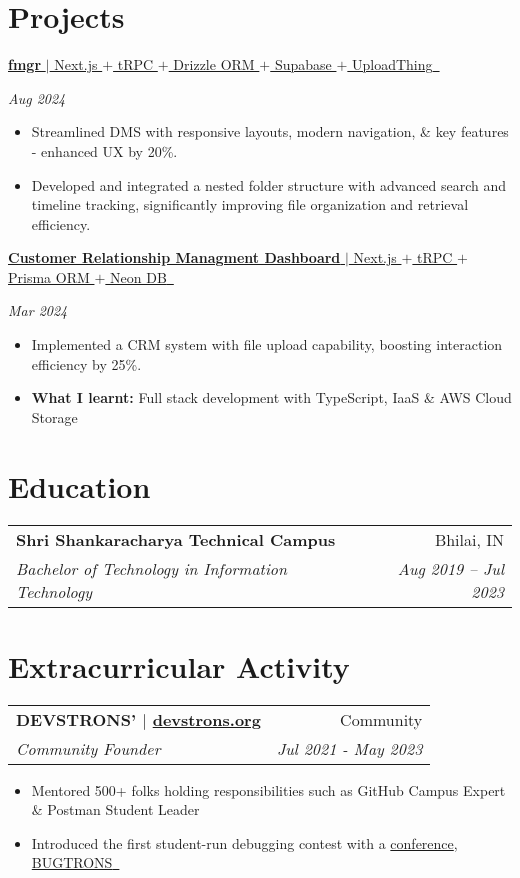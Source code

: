 \documentclass[letterpaper,11pt]{article}
\makeatletter
\newcommand{\resumeItem}[2]{
  \item\small{
    \textbf{#1}{#2 \vspace{-6pt}}
  }
}
\newcommand{\project}[2]{
\textbf{}{
\href{#2}{{#1} \,\faExternalLink}
}
    \hfill
}
\newcommand{\projectHeading}[3]{\project{#1}{#2}
{#3}\\ \vspace{-1pt}}
\newcommand{\resumeSubHeading}[4]{
    \vspace{-1pt}
    \begin{tabular*}{\textwidth}{l@{\extracolsep{\fill}}r}
      \textbf{#1} & #2 \\
      \textit{\small#3} & \textit{\small #4} \\
    \end{tabular*}\vspace{-5pt}
}
\newcommand{\resumeSubHeadingListStart}{\begin{itemize}[leftmargin=*]}
\newcommand{\resumeSubHeadingListEnd}{\end{itemize}}
\newcommand{\resumeItemListStart}{\begin{itemize}}
\newcommand{\resumeItemListEnd}{\end{itemize}\vspace{-5pt}}
\makeatother
\begin{document}
\section{Projects}
\vspace{2pt}
\projectHeading{\textbf{fmgr} $|$ Next.js $+$ tRPC $+$ Drizzle ORM $+$ Supabase $+$ UploadThing}{https://fmgr.vercel.app}{\textit{\small{Aug 2024}}}
\vspace{-5pt}
\resumeItemListStart
\resumeItem{}{Streamlined DMS with responsive layouts, modern navigation, \& key features - enhanced UX by 20\%.}
\vspace{0pt}
\resumeItem{}{Developed and integrated a nested folder structure with advanced search and timeline tracking, significantly improving file organization and retrieval efficiency.}
\resumeItemListEnd
\vspace{9pt}
\projectHeading{\textbf{Customer Relationship Managment Dashboard} $|$ Next.js $+$ tRPC $+$ Prisma ORM $+$ Neon DB}{https://github.com/aminoxix/crm}{\textit{\small{Mar 2024}}}
\vspace{-5pt}
\resumeItemListStart
\resumeItem{}{Implemented a CRM system with file upload capability, boosting interaction efficiency by 25\%.}
\vspace{0pt}
\resumeItem{What I learnt: }{Full stack development with TypeScript, IaaS \& AWS Cloud Storage}
\resumeItemListEnd
\vspace{-2pt}

\section{Education}
\resumeSubHeading
{Shri Shankaracharya Technical Campus}{Bhilai, IN}
{Bachelor of Technology in Information Technology}{Aug 2019 -- Jul 2023}
\vspace{-4pt}

\section{Extracurricular Activity}
\resumeSubHeading
{DEVSTRONS' $|$ \href{https://devstrons.org}{devstrons.org}}{Community}
{Community Founder}{Jul 2021 - May 2023}
\resumeItemListStart
\resumeItem{}{Mentored 500+ folks holding responsibilities such as GitHub Campus Expert \& Postman Student Leader}
\resumeItem{}{Introduced the first student-run debugging contest with a \href{https://bit.ly/bugtrons2-con}{conference}, \href{https://bugtrons.netlify.app}{{BUGTRONS} \,\faExternalLink}}
\resumeItemListEnd
\vspace{6pt}
\end{document}
